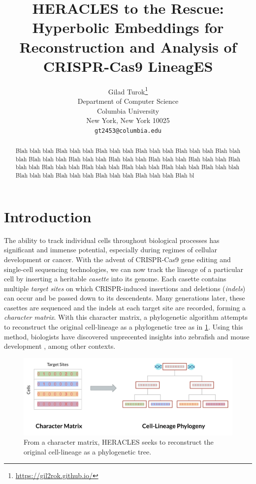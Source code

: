 \documentclass{article}
\title{HERACLES to the Rescue: Hyperbolic Embeddings for Reconstruction and Analysis of CRISPR-Cas9 LineagES}
\author{%
  Gilad Turok\thanks{\url{https://gil2rok.github.io/}} \\
  Department of Computer Science\\
  Columbia University\\
  New York, New York 10025 \\
  \texttt{gt2453@columbia.edu} \\
}
\begin{document}
\maketitle


\begin{abstract}
  Blah blah blah  Blah blah blah  Blah blah blah  Blah blah blah Blah blah blah Blah blah blah Blah blah blah Blah blah blah Blah blah blah Blah blah blah Blah blah blah Blah blah blah Blah blah blah Blah blah blah Blah blah blah Blah blah blah Blah blah blah Blah blah blah Blah blah blah Blah blah blah Blah blah blah Blah bl
\end{abstract}


\section{Introduction}


The ability to track individual cells throughout biological processes has significant and immense potential, especially during regimes of cellular development or cancer. With the advent of CRISPR-Cas9 gene editing and single-cell sequencing technologies, we can now track the lineage of a particular cell by inserting a heritable \emph{casette} into its genome. Each casette contains multiple \emph{target sites} on which CRISPR-induced insertions and deletions (\emph{indels}) can occur and be passed down to its descendents. Many generations later, these casettes are sequenced and the indels at each target site are recorded, forming a \emph{character matrix}. With this character matrix, a phylogenetic algorithm attempts to reconstruct the original cell-lineage as a phylogenetic tree as in \ref{fig:problem_statement}. Using this method, biologists have discovered unprecented insights into zebrafish \cite{McKenna2016} \cite{Raj2018}  and mouse development \cite{Kalhor2018} \cite{chan2019}, among other contexts.

\begin{figure}[t]
  \label{fig:problem_statement}
  \includegraphics[width=\linewidth]{images/problem_statement.png}
  \caption{From a character matrix, HERACLES seeks to reconstruct the original cell-lineage as a phylogenetic tree.}
\end{figure}
\end{document}
